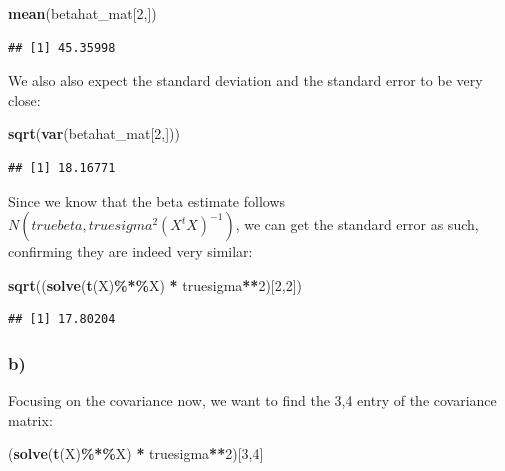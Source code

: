 \documentclass[
]{article}
\newenvironment{Shaded}{\begin{snugshade}}{\end{snugshade}}
\newcommand{\DecValTok}[1]{\textcolor[rgb]{0.00,0.00,0.81}{#1}}
\newcommand{\FunctionTok}[1]{\textcolor[rgb]{0.13,0.29,0.53}{\textbf{#1}}}
\newcommand{\NormalTok}[1]{#1}
\newcommand{\SpecialCharTok}[1]{\textcolor[rgb]{0.81,0.36,0.00}{\textbf{#1}}}
\begin{document}
\begin{Shaded}
\begin{Highlighting}[]
\FunctionTok{mean}\NormalTok{(betahat\_mat[}\DecValTok{2}\NormalTok{,])}
\end{Highlighting}
\end{Shaded}

\begin{verbatim}
## [1] 45.35998
\end{verbatim}

We also also expect the standard deviation and the standard error to be
very close:

\begin{Shaded}
\begin{Highlighting}[]
\FunctionTok{sqrt}\NormalTok{(}\FunctionTok{var}\NormalTok{(betahat\_mat[}\DecValTok{2}\NormalTok{,]))}
\end{Highlighting}
\end{Shaded}

\begin{verbatim}
## [1] 18.16771
\end{verbatim}

Since we know that the beta estimate follows
\(N(truebeta, truesigma^2 (X^tX)^{-1})\), we can get the standard error
as such, confirming they are indeed very similar:

\begin{Shaded}
\begin{Highlighting}[]
\FunctionTok{sqrt}\NormalTok{((}\FunctionTok{solve}\NormalTok{(}\FunctionTok{t}\NormalTok{(X)}\SpecialCharTok{\%*\%}\NormalTok{X) }\SpecialCharTok{*}\NormalTok{ truesigma}\SpecialCharTok{**}\DecValTok{2}\NormalTok{)[}\DecValTok{2}\NormalTok{,}\DecValTok{2}\NormalTok{])}
\end{Highlighting}
\end{Shaded}

\begin{verbatim}
## [1] 17.80204
\end{verbatim}

\subsubsection{b)}\label{b}

Focusing on the covariance now, we want to find the 3,4 entry of the
covariance matrix:

\begin{Shaded}
\begin{Highlighting}[]
\NormalTok{(}\FunctionTok{solve}\NormalTok{(}\FunctionTok{t}\NormalTok{(X)}\SpecialCharTok{\%*\%}\NormalTok{X) }\SpecialCharTok{*}\NormalTok{ truesigma}\SpecialCharTok{**}\DecValTok{2}\NormalTok{)[}\DecValTok{3}\NormalTok{,}\DecValTok{4}\NormalTok{]}
\end{Highlighting}
\end{Shaded}
\end{document}
